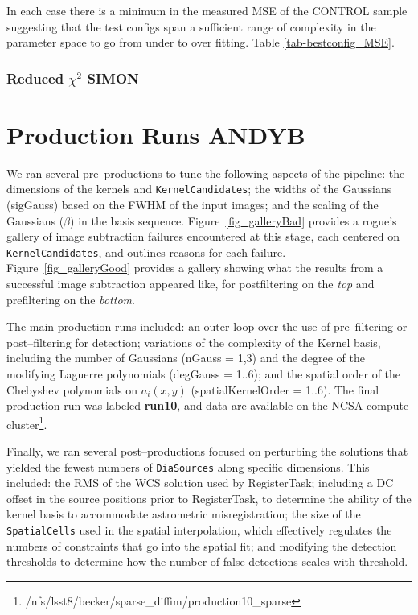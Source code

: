 \documentclass[prd, nofootinbib, floatfix, 11pt,tightenlines,times]{article}
\begin{document}
In each case there is a minimum in the measured MSE of the CONTROL sample suggesting
that the test configs span a sufficient range of complexity in the parameter space to 
go from under to over fitting.  Table \ref{tab-bestconfig_MSE}.

\subsubsection{Reduced $\chi^2$ {\bf SIMON}}


\section{Production Runs {\bf ANDYB}}

We ran several pre--productions to tune the following aspects of the
pipeline: the dimensions of the kernels and {\tt KernelCandidates};
the widths of the Gaussians (sigGauss) based on the FWHM of the input
images; and the scaling of the Gaussians ($\beta$) in the basis
sequence.  Figure~\ref{fig_galleryBad} provides a rogue's gallery of
image subtraction failures encountered at this stage, each centered on
{\tt KernelCandidates}, and outlines reasons for each failure.
Figure~\ref{fig_galleryGood} provides a gallery showing what the
results from a successful image subtraction appeared like, for
postfiltering on the {\it top} and prefiltering on the {\it bottom}.

The main production runs included: an outer loop over the use of
pre--filtering or post--filtering for detection; variations of the
complexity of the Kernel basis, including the number of Gaussians
(nGauss = 1,3) and the degree of the modifying Laguerre polynomials
(degGauss = 1..6); and the spatial order of the Chebyshev polynomials
on $a_i(x,y)$ (spatialKernelOrder = 1..6).  The final production run
was labeled {\bf run10}, and data are available on the NCSA compute
cluster\footnote{/nfs/lsst8/becker/sparse\_diffim/production10\_sparse}.

Finally, we ran several post--productions focused on perturbing the
solutions that yielded the fewest numbers of {\tt DiaSources} along specific
dimensions.  This included: the RMS of the WCS solution used by
RegisterTask; including a DC offset in the source positions prior to
RegisterTask, to determine the ability of the kernel basis to
accommodate astrometric misregistration; the size of the {\tt
  SpatialCells} used in the spatial interpolation, which effectively
regulates the numbers of constraints that go into the spatial fit; and
modifying the detection thresholds to determine how the number of
false detections scales with threshold.
\end{document}
